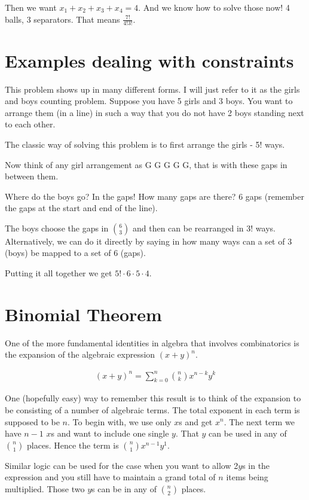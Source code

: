 \documentclass[12pt]{article}
\begin{document}
Then we want $x_1 + x_2 + x_3 + x_4 = 4$. And we know how to solve those now! 4 balls, 3 separators. That means $\frac{7!}{4!3!}$.

\section*{Examples dealing with constraints}
This problem shows up in many different forms. I will just refer to it as the girls and boys counting problem. Suppose you have 5 girls and 3 boys. You want to arrange them (in a line) in such a way that you do not have 2 boys standing next to each other. 

The classic way of solving this problem is to first arrange the girls - 5! ways.

Now think of any girl arrangement as G G G G G, that is with these gaps in between them.

Where do the boys go? In the gaps! How many gaps are there? 6 gaps (remember the gaps at the start and end of the line). 

The boys choose the gaps in $\binom{6}{3}$ and then can be rearranged in 3! ways. Alternatively, we can do it directly by saying in how many ways can a set of 3 (boys) be mapped to a set of 6 (gaps).

Putting it all together we get $5! \cdot 6\cdot 5\cdot 4$.  

\section*{Binomial Theorem}
One of the more fundamental identities in algebra that involves combinatorics is the expansion of the algebraic expression $(x+y)^n$.

\begin{align*}
(x+y)^n = \sum_{k=0}^n {n \choose k} x^{n-k}y^k
\end{align*}

One (hopefully easy) way to remember this result is to think of the expansion to be consisting of a number of algebraic terms. The total exponent in each term is supposed to be $n$. To begin with, we use only $x$s and get $x^n$. The next term we have $n-1$ $x$s and want to include one single $y$. That $y$ can be used in any of ${n \choose 1}$ places. Hence the term is ${n \choose 1} x^{n-1}y^1$.

Similar logic can be used for the case when you want to allow 2$y$s in the expression and you still have to maintain a grand total of $n$ items being multiplied. Those two $y$s can be in any of ${n \choose 2}$ places.
\end{document}

